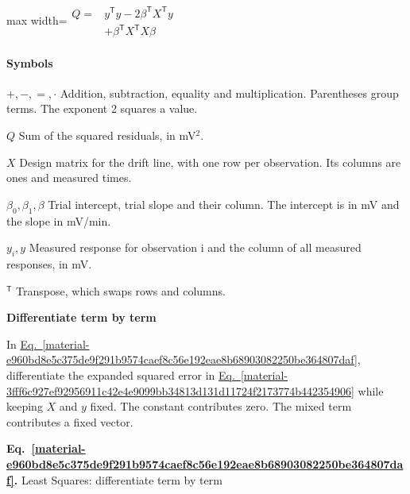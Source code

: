 \documentclass[11pt,a4paper]{article}
\begin{document}
\begin{center}\begin{adjustbox}{max width=\linewidth}$\displaystyle \begin{aligned}Q={}&y^{\mathsf T}y-2\beta^{\mathsf T}X^{\mathsf T}y\\ &+\beta^{\mathsf T}X^{\mathsf T}X\beta\end{aligned}$\end{adjustbox}\end{center}

\paragraph{Symbols}
\par\noindent\textbf{\(+,-,=,\cdot\)} Addition, subtraction, equality and multiplication. Parentheses group terms. The exponent 2 squares a value.
\par\noindent\textbf{\(Q\)} Sum of the squared residuals, in mV\ensuremath{{}^2}.
\par\noindent\textbf{\(X\)} Design matrix for the drift line, with one row per observation. Its columns are ones and measured times.
\par\noindent\textbf{\(\beta_0,\beta_1,\beta\)} Trial intercept, trial slope and their column. The intercept is in mV and the slope in mV/min.
\par\noindent\textbf{\(y_i,y\)} Measured response for observation i and the column of all measured responses, in mV.
\par\noindent\textbf{\({}^{\mathsf T}\)} Transpose, which swaps rows and columns.
\medskip

\textbf{Differentiate term by term}


In \hyperref[material-e960bd8e5c375de9f291b9574caef8c56e192eae8b68903082250be364807daf]{Eq.~\ref*{material-e960bd8e5c375de9f291b9574caef8c56e192eae8b68903082250be364807daf}}, differentiate the expanded squared error in \hyperref[material-3fff6c927ef92956911c42e4e9099bb34813d131d11724f2173774b442354906]{Eq.~\ref*{material-3fff6c927ef92956911c42e4e9099bb34813d131d11724f2173774b442354906}} while keeping \(X\) and \(y\) fixed. The constant contributes zero. The mixed term contributes a fixed vector.


\par\medskip
{}
\label{material-e960bd8e5c375de9f291b9574caef8c56e192eae8b68903082250be364807daf}
\noindent\textbf{Eq.~\ref*{material-e960bd8e5c375de9f291b9574caef8c56e192eae8b68903082250be364807daf}.} Least Squares: differentiate term by term\par\nopagebreak
\end{document}
